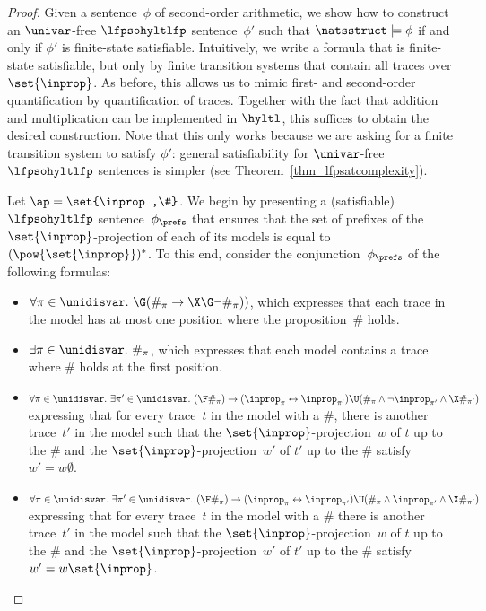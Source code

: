 \begin{proof}
Given a sentence~$\phi$ of second-order arithmetic, we show how to construct an $\univar$-free $\lfpsohyltlfp$ sentence~$\phi'$ such that  $\natsstruct\models\phi$ if and only if $\phi'$ is finite-state satisfiable.
Intuitively, we write a formula that is finite-state satisfiable, but only by finite transition systems that contain all traces over $\set{\inprop}$.
As before, this allows us to mimic first- and second-order quantification by quantification of traces.
Together with the fact that addition and multiplication can be implemented in $\hyltl$, this suffices to obtain the desired construction.
Note that this only works because we are asking for a finite transition system to satisfy $\phi'$: general satisfiability for $\univar$-free $\lfpsohyltlfp$ sentences is simpler (see Theorem~\ref{thm_lfpsatcomplexity}).

Let $\ap = \set{\inprop,\#}$.
We begin by presenting a (satisfiable) $\lfpsohyltlfp$ sentence~$\phi_\prefs$ that ensures that the set of prefixes of the $\set{\inprop}$-projection of each of its models is equal to $(\pow{\set{\inprop}})^*$.
To this end, consider the conjunction~$\phi_\prefs$ of the following formulas:
\begin{itemize}
    \item $\forall \pi \in \unidisvar.\ \G(\#_\pi \rightarrow \X\G\neg \#_\pi))$, which expresses that each trace in the model has at most one position where the proposition~$\#$ holds.
    \item $\exists \pi \in \unidisvar.\  \#_{\pi}$, which expresses that each model contains a trace where $\#$ holds at the first position.
    \item $\forall \pi \in \unidisvar.\ \exists \pi' \in \unidisvar.\ (\F\#_\pi) \rightarrow (\inprop_\pi \leftrightarrow \inprop_{\pi'}) \U (\#_{\pi} \wedge \neg\inprop_{\pi'} \wedge \X\#_{\pi'} )$ expressing that for every trace~$t$ in the model with a $\#$, there is another trace~$t'$ in the model such that the $\set{\inprop}$-projection~$w$ of $t$ up to the $\#$ and the $\set{\inprop}$-projection~$w'$ of $t'$ up to the $\#$ satisfy $w' = w\emptyset$.
    \item $\forall \pi \in \unidisvar.\ \exists \pi' \in \unidisvar.\ (\F\#_\pi)\rightarrow (\inprop_\pi \leftrightarrow \inprop_{\pi'}) \U (\#_{\pi} \wedge \inprop_{\pi'} \wedge \X\#_{\pi'} )$ expressing that for every trace~$t$ in the model with a $\#$ there is another trace~$t'$ in the model such that the $\set{\inprop}$-projection~$w$ of $t$ up to the $\#$ and the $\set{\inprop}$-projection~$w'$ of $t'$ up to the $\#$ satisfy $w' = w\set{\inprop}$.   
\end{itemize}


\end{proof}
